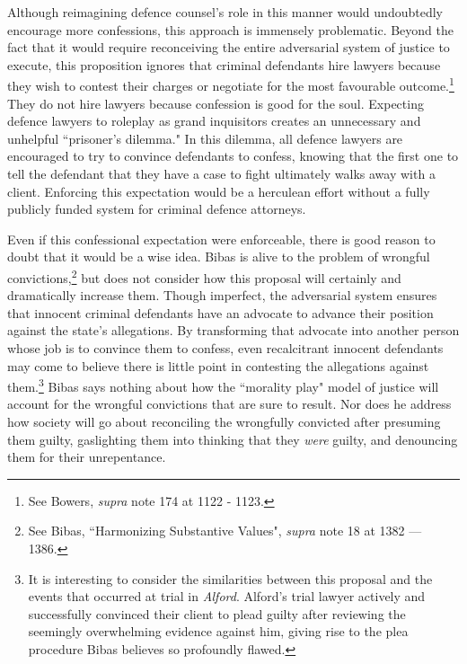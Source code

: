 Although reimagining defence counsel's role in this manner would undoubtedly encourage more confessions, this approach is immensely problematic. Beyond the fact that it would require reconceiving the entire adversarial system of justice to execute, this proposition ignores that criminal defendants hire lawyers because they wish to contest their charges or negotiate for the most favourable outcome.\footnote{See Bowers, \textit{supra} note 174 at 1122 - 1123.} They do not hire lawyers because confession is good for the soul. Expecting defence lawyers to roleplay as grand inquisitors creates an unnecessary and unhelpful ``prisoner's dilemma." In this dilemma, all defence lawyers are encouraged to try to convince defendants to confess, knowing that the first one to tell the defendant that they have a case to fight ultimately walks away with a client. Enforcing this expectation would be a herculean effort without a fully publicly funded system for criminal defence attorneys.

Even if this confessional expectation were enforceable, there is good reason to doubt that it would be a wise idea. Bibas is alive to the problem of wrongful convictions,\footnote{See Bibas, ``Harmonizing Substantive Values", \textit{supra} note 18 at 1382 — 1386.} but does not consider how this proposal will certainly and dramatically increase them. Though imperfect, the adversarial system ensures that innocent criminal defendants have an advocate to advance their position against the state's allegations. By transforming that advocate into another person whose job is to convince them to confess, even recalcitrant innocent defendants may come to believe there is little point in contesting the allegations against them.\footnote{It is interesting to consider the similarities between this proposal and the events that occurred at trial in \textit{Alford}. Alford's trial lawyer actively and successfully convinced their client to plead guilty after reviewing the seemingly overwhelming evidence against him, giving rise to the plea procedure Bibas believes so profoundly flawed.} Bibas says nothing about how the ``morality play" model of justice will account for the wrongful convictions that are sure to result. Nor does he address how society will go about reconciling the wrongfully convicted after presuming them guilty, gaslighting them into thinking that they \textit{were} guilty, and denouncing them for their unrepentance. 

